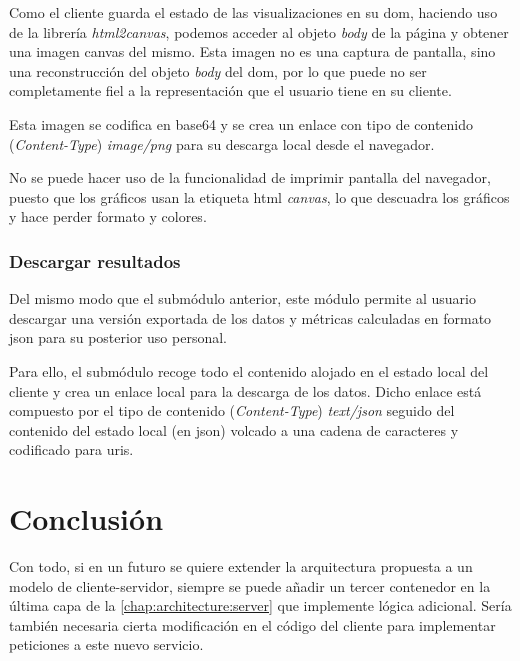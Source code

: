 Como el cliente guarda el estado de las visualizaciones en su \acrshort{dom}, haciendo uso de la librería \textit{html2canvas}, podemos acceder al objeto \textit{body} de la página y obtener una imagen canvas del mismo. Esta imagen no es una captura de pantalla, sino una reconstrucción del objeto \textit{body} del \acrshort{dom}, por lo que puede no ser completamente fiel a la representación que el usuario tiene en su cliente.

Esta imagen se codifica en base64 y se crea un enlace con tipo de contenido (\textit{Content-Type}) \textit{image/png}  para su descarga local desde el navegador.

No se puede hacer uso de la funcionalidad de imprimir pantalla del navegador, puesto que los gráficos usan la etiqueta \acrshort{html} \textit{canvas}, lo que descuadra los gráficos y hace perder formato y colores.

\subsubsection{Descargar resultados}

Del mismo modo que el submódulo anterior, este módulo permite al usuario descargar una versión exportada de los datos y métricas calculadas en formato \acrshort{json} para su posterior uso personal.

Para ello, el submódulo recoge todo el contenido alojado en el estado local del cliente y crea un enlace local para la descarga de los datos. Dicho enlace está compuesto por el tipo de contenido (\textit{Content-Type}) \textit{text/json} seguido del contenido del estado local (en \acrshort{json}) volcado a una cadena de caracteres y codificado para \acrshort{uri}s.




\section{Conclusión}

Con todo, si en un futuro se quiere extender la arquitectura propuesta a un modelo de cliente-servidor, siempre se puede añadir un tercer contenedor en la última capa de la \autoref{chap:architecture:server} que implemente lógica adicional. Sería también necesaria cierta modificación en el código del cliente para implementar peticiones a este nuevo servicio.

